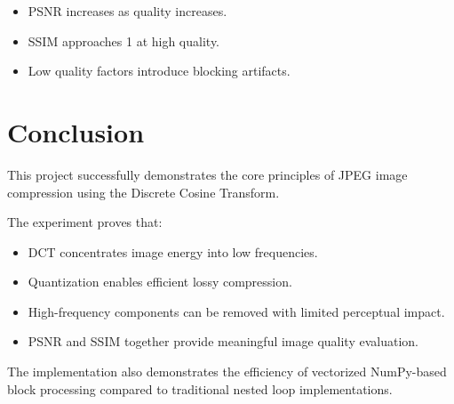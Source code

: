 \documentclass[12pt,a4paper]{article}
\begin{document}
\begin{itemize}
    \item PSNR increases as quality increases.
    \item SSIM approaches 1 at high quality.
    \item Low quality factors introduce blocking artifacts.
\end{itemize}

\section{Conclusion}

This project successfully demonstrates the core principles of JPEG image compression using the Discrete Cosine Transform.

The experiment proves that:
\begin{itemize}
    \item DCT concentrates image energy into low frequencies.
    \item Quantization enables efficient lossy compression.
    \item High-frequency components can be removed with limited perceptual impact.
    \item PSNR and SSIM together provide meaningful image quality evaluation.
\end{itemize}

The implementation also demonstrates the efficiency of vectorized NumPy-based block processing compared to traditional nested loop implementations.
\end{document}
